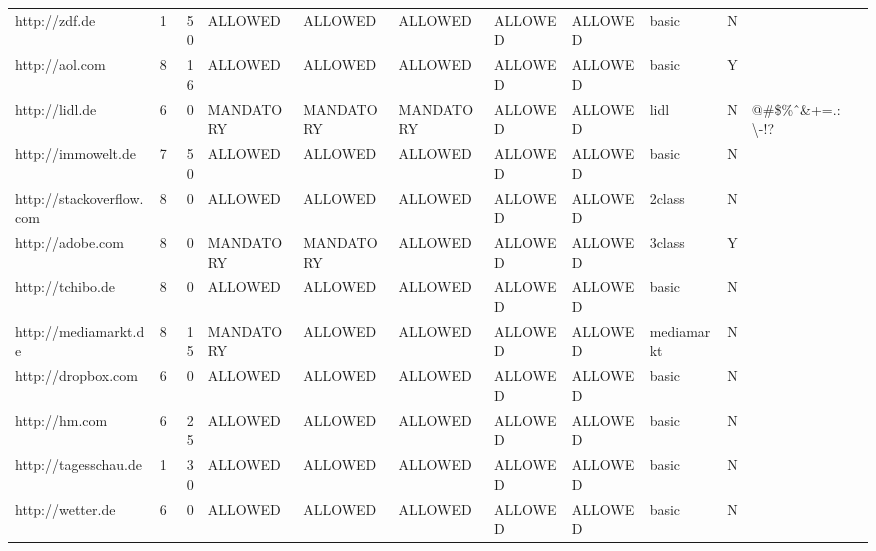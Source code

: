 \begin{table}[htbp]
{{\begin{tabular}{lrrlllllllrr}
    http://zdf.de & 1     & 50    & ALLOWED & ALLOWED & ALLOWED & ALLOWED & ALLOWED & basic & N     &       &  \\
    http://aol.com & 8     & 16    & ALLOWED & ALLOWED & ALLOWED & ALLOWED & ALLOWED & basic & Y     &       &  \\
    http://lidl.de & 6     & 0     & MANDATORY & MANDATORY & MANDATORY & ALLOWED & ALLOWED & lidl  & N     & \multicolumn{1}{l}{@\#\$\%ˆ\&+=.:\textbackslash{}-!?} &  \\
    http://immowelt.de & 7     & 50    & ALLOWED & ALLOWED & ALLOWED & ALLOWED & ALLOWED & basic & N     &       &  \\
    http://stackoverflow.com & 8     & 0     & ALLOWED & ALLOWED & ALLOWED & ALLOWED & ALLOWED & 2class & N     &       &  \\
    http://adobe.com & 8     & 0     & MANDATORY & MANDATORY & ALLOWED & ALLOWED & ALLOWED & 3class & Y     &       &  \\
    http://tchibo.de & 8     & 0     & ALLOWED & ALLOWED & ALLOWED & ALLOWED & ALLOWED & basic & N     &       &  \\
    http://mediamarkt.de & 8     & 15    & MANDATORY & ALLOWED & ALLOWED & ALLOWED & ALLOWED & mediamarkt & N     &       &  \\
    http://dropbox.com & 6     & 0     & ALLOWED & ALLOWED & ALLOWED & ALLOWED & ALLOWED & basic & N     &       &  \\
    http://hm.com & 6     & 25    & ALLOWED & ALLOWED & ALLOWED & ALLOWED & ALLOWED & basic & N     &       &  \\
    http://tagesschau.de & 1     & 30    & ALLOWED & ALLOWED & ALLOWED & ALLOWED & ALLOWED & basic & N     &       &  \\
    http://wetter.de & 6     & 0     & ALLOWED & ALLOWED & ALLOWED & ALLOWED & ALLOWED & basic & N     &       &  \\
    \end{tabular}%
	}%
	}%
\end{table}%